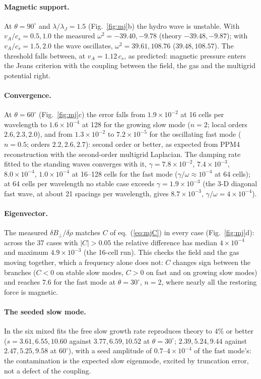 \documentclass[11pt]{article}
\begin{document}
\paragraph{Magnetic support.} At $\theta = 90^\circ$ and $\lambda/\lambda_J = 1.5$
(Fig.~\ref{fig:mj}b) the hydro wave is unstable. With $v_A/c_s = 0.5, 1.0$ the measured
$\omega^2 = -39.40, -9.78$ (theory $-39.48, -9.87$); with $v_A/c_s = 1.5, 2.0$ the wave
oscillates, $\omega^2 = 39.61, 108.76$ ($39.48, 108.57$). The threshold falls between, at
$v_A = 1.12\,c_s$, as predicted: magnetic pressure enters the Jeans criterion with the
coupling between the field, the gas and the multigrid potential right.

\paragraph{Convergence.} At $\theta = 60^\circ$ (Fig.~\ref{fig:mj}c) the error falls from
$1.9\times10^{-2}$ at 16 cells per wavelength to $1.6\times10^{-4}$ at 128 for the growing
slow mode ($n = 2$; local orders $2.6, 2.3, 2.0$), and from $1.3\times10^{-2}$ to
$7.2\times10^{-5}$ for the oscillating fast mode ($n = 0.5$; orders $2.2, 2.6, 2.7$): second
order or better, as expected from PPM4 reconstruction with the second-order multigrid
Laplacian. The damping rate fitted to the standing waves converges with it,
$\gamma = 7.8\times10^{-2}$, $7.4\times10^{-3}$, $8.0\times10^{-4}$, $1.0\times10^{-4}$ at
16--128 cells for the fast mode ($\gamma/\omega \approx 10^{-4}$ at 64 cells); at 64 cells per
wavelength no stable case exceeds $\gamma = 1.9\times10^{-3}$ (the 3-D diagonal fast wave, at
about 21 spacings per wavelength, gives $8.7\times10^{-3}$, $\gamma/\omega = 4\times10^{-4}$).

\paragraph{Eigenvector.} The measured $\delta B_\perp/\delta\rho$ matches $C$ of
eq.~(\ref{eq:mjC}) in every case (Fig.~\ref{fig:mj}d): across the 37 cases with
$|C| > 0.05$ the relative difference has median $4\times10^{-4}$ and maximum
$4.9\times10^{-3}$ (the 16-cell run). This checks the field and the gas moving together,
which a frequency alone does not: $C$ changes sign between the branches ($C < 0$ on stable
slow modes, $C > 0$ on fast and on growing slow modes) and reaches $7.6$ for the fast mode
at $\theta = 30^\circ$, $n = 2$, where nearly all the restoring force is magnetic.

\paragraph{The seeded slow mode.} In the six mixed fits the free slow growth rate
reproduces theory to $4\%$ or better ($s = 3.61, 6.55, 10.60$ against $3.77, 6.59, 10.52$ at
$\theta = 30^\circ$; $2.39, 5.24, 9.44$ against $2.47, 5.25, 9.58$ at $60^\circ$), with a
seed amplitude of $0.7$--$4\times10^{-4}$ of the fast mode's: the contamination is the
expected slow eigenmode, excited by truncation error, not a defect of the coupling.
\end{document}
